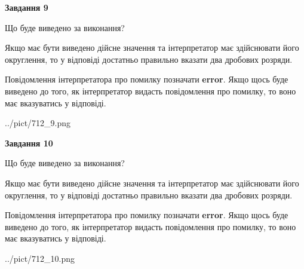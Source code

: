 \documentclass[12pt, ukrainian]{article}
\begin{document}
{\begin {Large}
{\begin {center}\textbf{Завдання 9}\end {center}}\par
Що буде виведено за виконання? \par

Якщо має бути виведено дійсне значення та інтерпретатор має здійснювати його округлення, 
то у відповіді достатньо правильно вказати два дробових розряди.

Повідомлення інтерпретатора про помилку позначати \textbf{error}.
Якщо щось буде виведено до того, як інтерпретатор видасть повідомлення про помилку, 
то воно має вказуватись у відповіді. \par

\begin{center}
	{../pict/712_9.png}
\end{center}
\newpage

{\begin {center}\textbf{Завдання 10}\end {center}}\par
Що буде виведено за виконання? \par

Якщо має бути виведено дійсне значення та інтерпретатор має здійснювати його округлення, 
то у відповіді достатньо правильно вказати два дробових розряди.

Повідомлення інтерпретатора про помилку позначати \textbf{error}.
Якщо щось буде виведено до того, як інтерпретатор видасть повідомлення про помилку, 
то воно має вказуватись у відповіді. \par

\begin{center}
	{../pict/712_10.png}
\end{center}
\newpage

\end {Large}}
\end{document}
